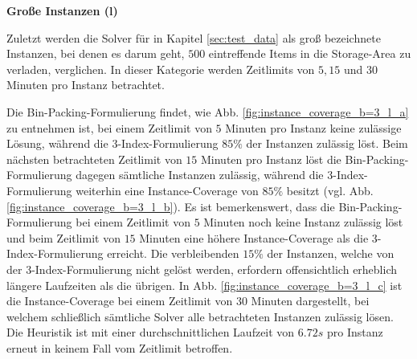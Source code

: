\textbf{Große Instanzen (l)}

Zuletzt werden die Solver für in Kapitel \ref{sec:test_data} als groß bezeichnete Instanzen,
bei denen es darum geht, $500$ eintreffende Items in die Storage-Area zu verladen, verglichen.
In dieser Kategorie werden Zeitlimits von $5, 15$ und $30$ Minuten pro Instanz betrachtet.

Die Bin-Packing-Formulierung findet, wie Abb. \ref{fig:instance_coverage_b=3_l_a} zu entnehmen ist,
bei einem Zeitlimit von $5$ Minuten pro Instanz keine zulässige Lösung, während die 3-Index-Formulierung
$85 \%$ der Instanzen zulässig löst. Beim nächsten betrachteten Zeitlimit von $15$ Minuten pro Instanz löst die Bin-Packing-Formulierung dagegen sämtliche Instanzen zulässig, während die 3-Index-Formulierung weiterhin eine Instance-Coverage von $85 \%$ besitzt (vgl. Abb. \ref{fig:instance_coverage_b=3_l_b}). Es ist bemerkenswert, dass die Bin-Packing-Formulierung bei einem Zeitlimit von $5$ Minuten noch keine Instanz zulässig löst und beim Zeitlimit
von $15$ Minuten eine höhere Instance-Coverage als die 3-Index-Formulierung erreicht. Die verbleibenden $15 \%$ der
Instanzen, welche von der 3-Index-Formulierung nicht gelöst werden, erfordern offensichtlich erheblich längere Laufzeiten als die übrigen. In Abb. \ref{fig:instance_coverage_b=3_l_c} ist die Instance-Coverage bei einem Zeitlimit von $30$ Minuten dargestellt, bei welchem schließlich sämtliche Solver alle betrachteten Instanzen zulässig lösen. Die Heuristik ist mit einer durchschnittlichen Laufzeit von $6.72s$ pro Instanz erneut in keinem Fall vom Zeitlimit betroffen.

\vfill
\pagebreak

